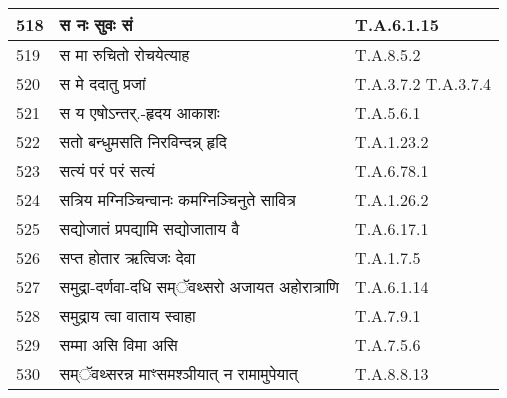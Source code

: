 \documentclass[17pt]{extarticle}
\begin{document}
\begin{longtable}{||p{0.4in}||p{4.9in}||p{0.9in}||}
    \hline
        
    518 & स नः सुवः सं & T.A.6.1.15       \\
    
    \hline
        
    519 & स मा रुचितो रोचयेत्याह & T.A.8.5.2       \\
    
    \hline
        
    520 & स मे ददातु प्रजां & T.A.3.7.2 T.A.3.7.4       \\
    
    \hline
        
    521 & स य एषोऽन्तर्.{-}हृदय आकाशः & T.A.5.6.1       \\
    
    \hline
        
    522 & सतो बन्धुमसति निरविन्दन्न् हृदि & T.A.1.23.2       \\
    
    \hline
        
    523 & सत्यं परं परं सत्यं & T.A.6.78.1       \\
    
    \hline
        
    524 & सत्रिय मग्निञ्चिन्वानः कमग्निञ्चिनुते सावित्र & T.A.1.26.2       \\
    
    \hline
        
    525 & सद्योजातं प्रपद्यामि सद्योजाताय वै & T.A.6.17.1       \\
    
    \hline
        
    526 & सप्त होतार ऋत्विजः देवा & T.A.1.7.5       \\
    
    \hline
        
    527 & समुद्रा{-}दर्णवा{-}दधि सम्ॅवथ्सरो अजायत अहोरात्राणि & T.A.6.1.14       \\
    
    \hline
        
    528 & समुद्राय त्वा वाताय स्वाहा & T.A.7.9.1       \\
    
    \hline
        
    529 & सम्मा असि विमा असि & T.A.7.5.6       \\
    
    \hline
        
    530 & सम्ॅवथ्सरन्न माꣳसमश्ञीयात् न रामामुपेयात् & T.A.8.8.13       \\
    

\end{longtable}
\end{document}
